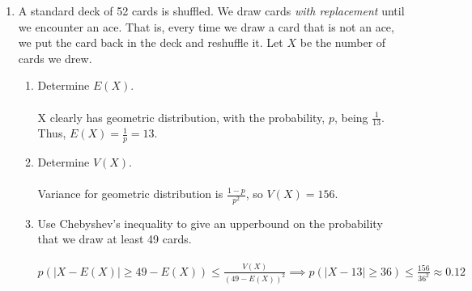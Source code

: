 \documentclass[12pt]{article}
\begin{document}
\begin{enumerate}
\item A standard deck of 52 cards is shuffled. We draw cards {\em with replacement} until we encounter an ace. That is, every time we draw a card that is not an ace, we put the card back in the deck and reshuffle it. Let $X$ be the number of cards we drew.
\begin{enumerate}
\item Determine $E(X)$.\\\\
X clearly has geometric distribution, with the probability, $p$, being $\frac{1}{13}$. Thus, $E(X)=\frac{1}{p}=13$.
\item Determine $V(X)$.\\\\
Variance for geometric distribution is $\frac{1-p}{p^2}$, so $V(X)=156$.
\item Use Chebyshev's inequality to give an upperbound on the probability that we draw at least 49 cards.\\\\
$p(|X-E(X)|\geq 49-E(X))\leq \frac{V(X)}{(49-E(X))^2} \implies p(|X-13|\geq 36)\leq \frac{156}{36^2} \approx 0.12$
\end{enumerate}

\end{enumerate}
\end{document}
